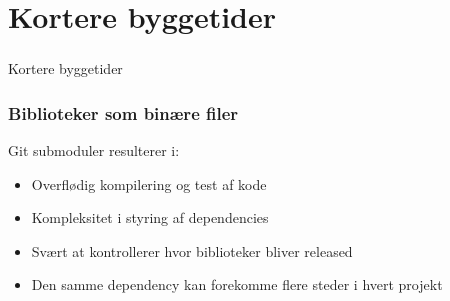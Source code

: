 \section[Kortere byggetider]{Kortere byggetider}

\begin{frame}
  \frametitle{}
  \begin{center}
    {\Huge Kortere byggetider}
  \end{center}
\end{frame}

\begin{frame}
    \frametitle{Biblioteker som binære filer}
	Git submoduler resulterer i:
    \begin{itemize}
        \item Overflødig kompilering og test af kode
        \item Kompleksitet i styring af dependencies
        \item Svært at kontrollerer hvor biblioteker bliver released
        \item Den samme dependency kan forekomme flere steder i hvert projekt
    \end{itemize}
\end{frame}

